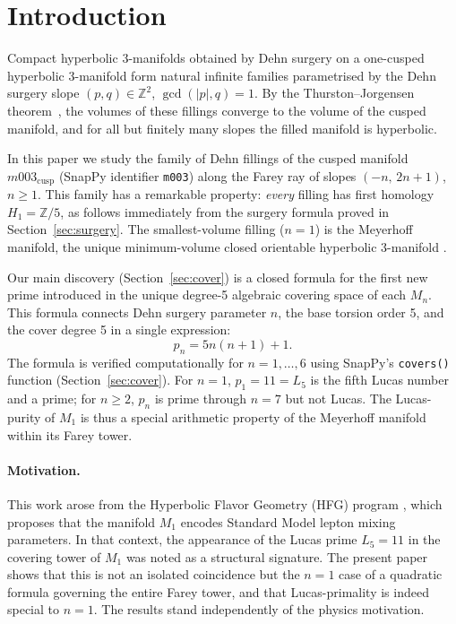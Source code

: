 \documentclass[11pt,a4paper]{article}
\theoremstyle{definition}
\newcommand{\ZZ}{\mathbb{Z}}
\newcommand{\Zfive}{\ZZ/5}
\newcommand{\Mn}{M_n}
\newcommand{\Mcusp}{m003_{\mathrm{cusp}}}
\begin{document}
\section{Introduction}
\label{sec:intro}

Compact hyperbolic 3-manifolds obtained by Dehn surgery on a
one-cusped hyperbolic 3-manifold form natural infinite families
parametrised by the Dehn surgery slope $(p,q) \in \ZZ^2$,
$\gcd(|p|,q)=1$.
By the Thurston--Jorgensen theorem~\cite{Thurston78}, the volumes
of these fillings converge to the volume of the cusped manifold,
and for all but finitely many slopes the filled manifold is hyperbolic.

In this paper we study the family of Dehn fillings of the cusped
manifold $\Mcusp$ (SnapPy identifier \texttt{m003}) along the
Farey ray of slopes $(-n,\,2n+1)$, $n \geq 1$.
This family has a remarkable property: \emph{every} filling has
first homology $H_1 = \Zfive$, as follows immediately from the
surgery formula proved in Section~\ref{sec:surgery}.
The smallest-volume filling ($n=1$) is the Meyerhoff manifold,
the unique minimum-volume closed orientable hyperbolic 3-manifold
\cite{GMM2009}.

Our main discovery (Section~\ref{sec:cover}) is a closed formula
for the first new prime introduced in the unique degree-5 algebraic
covering space of each $\Mn$.
This formula connects Dehn surgery parameter $n$, the base torsion
order 5, and the cover degree 5 in a single expression:
\[
  p_n = 5n(n+1)+1.
\]
The formula is verified computationally for $n = 1,\ldots,6$
using SnapPy's \texttt{covers()} function
(Section~\ref{sec:cover}).
For $n=1$, $p_1 = 11 = L_5$ is the fifth Lucas number and a prime;
for $n \geq 2$, $p_n$ is prime through $n=7$ but not Lucas.
The Lucas-purity of $M_1$ is thus a special arithmetic property
of the Meyerhoff manifold within its Farey tower.

\paragraph{Motivation.}
This work arose from the Hyperbolic Flavor Geometry (HFG) program
\cite{Gentry:Unified}, which proposes that the manifold $M_1$ encodes
Standard Model lepton mixing parameters.
In that context, the appearance of the Lucas prime $L_5 = 11$ in the
covering tower of $M_1$ was noted as a structural signature.
The present paper shows that this is not an isolated coincidence but
the $n=1$ case of a quadratic formula governing the entire Farey tower,
and that Lucas-primality is indeed special to $n=1$.
The results stand independently of the physics motivation.
\end{document}
